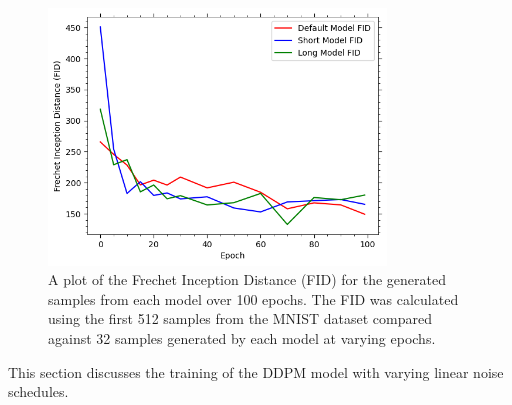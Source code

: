 \begin{figure}[t]
    \centering
    \includegraphics[width=0.8\textwidth]{figures/q1b_fid}
    \caption{A plot of the Frechet Inception Distance (FID) for the generated samples from each model over 100 epochs.
        The FID was calculated using the first 512 samples from the MNIST dataset compared against 32 samples generated
        by each model at varying epochs.}
    \label{fig:q1b_fid}
\end{figure}

This section discusses the training of the DDPM model with varying linear noise schedules.

